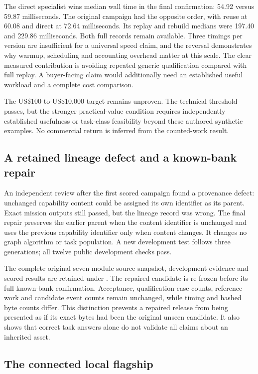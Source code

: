 \documentclass[11pt]{article}
\newcommand{\filename}[1]{\path{#1}}
\begin{document}
The direct specialist wins median wall time in the final confirmation: 54.92 versus 59.87 milliseconds. The original campaign had the opposite order, with reuse at 60.08 and direct at 72.64 milliseconds. Its replay and rebuild medians were 197.40 and 229.86 milliseconds. Both full records remain available. Three timings per version are insufficient for a universal speed claim, and the reversal demonstrates why warmup, scheduling and accounting overhead matter at this scale. The clear measured contribution is avoiding repeated generic qualification compared with full replay. A buyer-facing claim would additionally need an established useful workload and a complete cost comparison.

The US\$100-to-US\$10,000 target remains unproven. The technical threshold passes, but the stronger practical-value condition requires independently established usefulness or task-class feasibility beyond these authored synthetic examples. No commercial return is inferred from the counted-work result.


\subsection{A retained lineage defect and a known-bank repair}

An independent review after the first scored campaign found a provenance defect: unchanged capability content could be assigned its own identifier as its parent. Exact mission outputs still passed, but the lineage record was wrong. The final repair preserves the earlier parent when the content identifier is unchanged and uses the previous capability identifier only when content changes. It changes no graph algorithm or task population. A new development test follows three generations; all twelve public development checks pass.

The complete original seven-module source snapshot, development evidence and scored results are retained under \filename{study/results/scored-v1/candidate-source/}. The repaired candidate is re-frozen before its full known-bank confirmation. Acceptance, qualification-case counts, reference work and candidate event counts remain unchanged, while timing and hashed byte counts differ. This distinction prevents a repaired release from being presented as if its exact bytes had been the original unseen candidate. It also shows that correct task answers alone do not validate all claims about an inherited asset.

\subsection{The connected local flagship}
\end{document}
